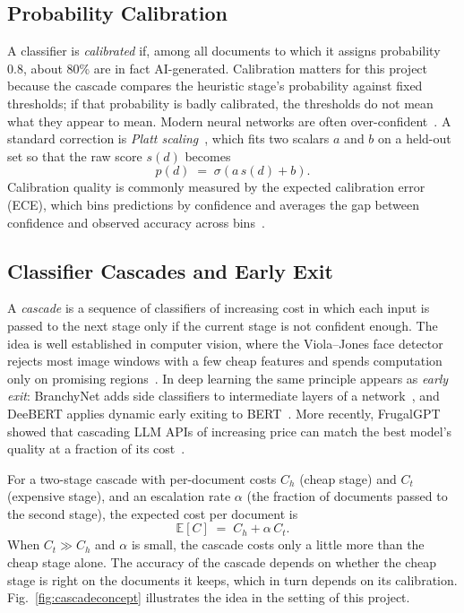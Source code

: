 \subsection{Probability Calibration}

A classifier is \emph{calibrated} if, among all documents to which it assigns
probability $0.8$, about 80\% are in fact AI-generated. Calibration matters for
this project because the cascade compares the heuristic stage's probability
against fixed thresholds; if that probability is badly calibrated, the
thresholds do not mean what they appear to mean. Modern neural networks are
often over-confident~\cite{guo2017calibration}. A standard correction is
\emph{Platt scaling}~\cite{platt1999probabilistic}, which fits two scalars
$a$ and $b$ on a held-out set so that the raw score $s(d)$ becomes
\begin{equation}
  p(d) \;=\; \sigma\!\left(a\,s(d) + b\right).
  \label{eq:platt}
\end{equation}
Calibration quality is commonly measured by the expected calibration error
(ECE), which bins predictions by confidence and averages the gap between
confidence and observed accuracy across bins~\cite{guo2017calibration}.

\subsection{Classifier Cascades and Early Exit}

A \emph{cascade} is a sequence of classifiers of increasing cost in which each
input is passed to the next stage only if the current stage is not confident
enough. The idea is well established in computer vision, where the
Viola--Jones face detector rejects most image windows with a few cheap features
and spends computation only on promising regions~\cite{viola2001rapid}. In deep
learning the same principle appears as \emph{early exit}: BranchyNet adds
side classifiers to intermediate layers of a network~\cite{teerapittayanon2016branchynet},
and DeeBERT applies dynamic early exiting to BERT~\cite{xin2020deebert}. More
recently, FrugalGPT showed that cascading LLM APIs of increasing price can
match the best model's quality at a fraction of its cost~\cite{chen2023frugalgpt}.

For a two-stage cascade with per-document costs $C_h$ (cheap stage) and $C_t$
(expensive stage), and an escalation rate $\alpha$ (the fraction of documents
passed to the second stage), the expected cost per document is
\begin{equation}
  \mathbb{E}[C] \;=\; C_h + \alpha\, C_t .
  \label{eq:cascadecost}
\end{equation}
When $C_t \gg C_h$ and $\alpha$ is small, the cascade costs only a little more
than the cheap stage alone. The accuracy of the cascade depends on whether the
cheap stage is right on the documents it keeps, which in turn depends on its
calibration. Fig.~\ref{fig:cascadeconcept} illustrates the idea in the setting
of this project.

